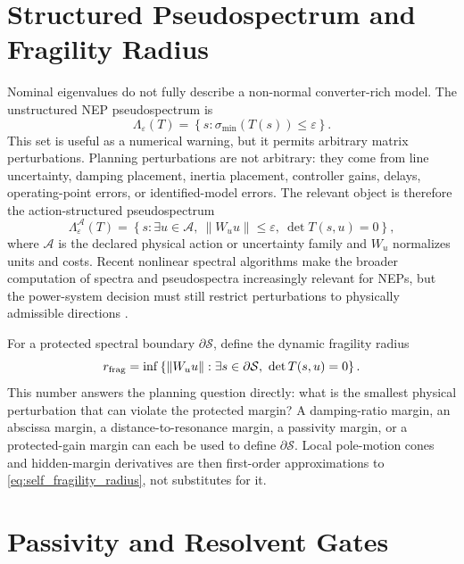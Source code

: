 \section{Structured Pseudospectrum and Fragility Radius}

Nominal eigenvalues do not fully describe a non-normal converter-rich model.
The unstructured NEP pseudospectrum is
\begin{equation}
  \Lambda_\varepsilon(T)
  =
  \left\{
  s:\sigma_{\min}(T(s))\le\varepsilon
  \right\}.
  \label{eq:self_unstructured_pseudospectrum}
\end{equation}
This set is useful as a numerical warning, but it permits arbitrary matrix
perturbations. Planning perturbations are not arbitrary: they come from line
uncertainty, damping placement, inertia placement, controller gains, delays,
operating-point errors, or identified-model errors. The relevant object is
therefore the action-structured pseudospectrum
\begin{equation}
  \Lambda_\varepsilon^{\mathcal A}(T)
  =
  \left\{
  s:\exists u\in\mathcal A,\ 
  \|W_uu\|\le\varepsilon,\ 
  \det T(s,u)=0
  \right\},
  \label{eq:self_structured_pseudospectrum}
\end{equation}
where \(\mathcal A\) is the declared physical action or uncertainty family and
\(W_u\) normalizes units and costs. Recent nonlinear spectral algorithms make
the broader computation of spectra and pseudospectra increasingly relevant for
NEPs, but the power-system decision must still restrict perturbations to
physically admissible directions \cite{colbrook2025universal}.

For a protected spectral boundary \(\partial\mathcal S\), define the dynamic
fragility radius
\begin{equation}
  r_{\rm frag}
  =
  \inf
  \left\{
  \|W_uu\|:
  \exists s\in\partial\mathcal S,\ 
  \det T(s,u)=0
  \right\}.
  \label{eq:self_fragility_radius}
\end{equation}
This number answers the planning question directly: what is the smallest
physical perturbation that can violate the protected margin? A damping-ratio
margin, an abscissa margin, a distance-to-resonance margin, a passivity margin,
or a protected-gain margin can each be used to define
\(\partial\mathcal S\). Local pole-motion cones and hidden-margin derivatives
are then first-order approximations to \eqref{eq:self_fragility_radius}, not
substitutes for it.

\section{Passivity and Resolvent Gates}

